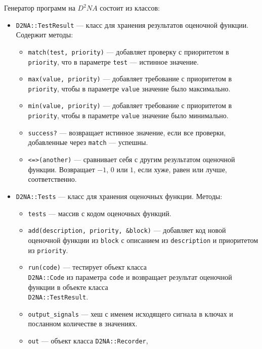 \documentclass[utf8,a5paper,portrait,10pt,twoside]{eskdtext}
\begin{document}
Генератор программ на $D^2NA$ состоит из классов:
\begin{itemize}
  \item \texttt{D2NA::TestResult} — класс для хранения результатов оценочной
        функции. Содержит методы:
        \begin{itemize}
          \item \texttt{match(test, priority)} — добавляет проверку с
                приоритетом в \texttt{priority}, что в параметре \texttt{test} —
                истинное значение.
          \item \texttt{max(value, priority)} — добавляет требование с
                приоритетом в \texttt{priority}, чтобы в параметре
                \texttt{value} значение было максимально.
          \item \texttt{min(value, priority)} — добавляет требование с
                приоритетом в \texttt{priority}, чтобы в параметре
                \texttt{value} значение было минимально.
          \item \texttt{success?} — возвращает истинное значение, если все
                проверки, добавленные через \texttt{match} — успешны.
          \item \texttt{<=>(another)} — сравнивает себя с другим результатом
                оценочной функции. Возвращает $-1$, $0$ или $1$, если хуже,
                равен или лучше, соответственно.
        \end{itemize}
  \item \texttt{D2NA::Tests} — класс для хранения оценочных функции. Методы:
        \begin{itemize}
          \item \texttt{tests} — массив с кодом оценочных функций.
          \item \texttt{add(description, priority, \&block)} — добавляет код
                новой оценочной функции из \texttt{block} с описанием из
                \texttt{description} и приоритетом из \texttt{priority}.
          \item \texttt{run(code)} — тестирует объект класса\\
                \texttt{D2NA::Code} из параметра \texttt{code} и возвращает
                результат оценочной функции в объекте класса\\
                \texttt{D2NA::TestResult}.
          \item \texttt{output\_signals} — хеш с именем исходящего сигнала в
                ключах и посланном количестве в значениях.
          \item \texttt{out} — объект класса \texttt{D2NA::Recorder},

\end{itemize}
\end{itemize}
\end{document}
